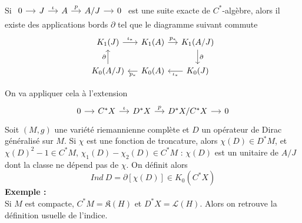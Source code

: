 \documentclass{beamer}
\begin{document}
\begin{frame}
\begin{thm}
Si $\begin{tikzcd}[ampersand replacement=\&,column sep = small]
0 \arrow{r} \& J \arrow{r}{\iota} \& A\arrow{r}{p} \& A/J\arrow{r} \& 0  
\end{tikzcd}$ est une suite exacte de $C^*$-algèbre, alors il existe des applications bords $\partial$ tel que le diagramme suivant commute
\[\begin{tikzcd}[ampersand replacement=\&,column sep = small]
 K_1(J)\arrow{r}{\iota_*}\& K_1(A)\arrow{r}{p_*}\& K_1(A/J)\arrow{d}{\partial}\\
K_0(A/J)\arrow{u}{\partial}\& K_0(A)\arrow{l}{p_*}\& K_0(J)\arrow{l}{\iota_*}
\end{tikzcd}\]
\end{thm}
\end{frame}

\begin{frame}
On va appliquer cela à l'extension \[\begin{tikzcd}[ampersand replacement=\&,column sep = small]
0 \arrow{r} \& C^*X \arrow{r}{\iota} \& D^*X\arrow{r}{p} \& D^*X/C^*X\arrow{r} \& 0  
\end{tikzcd}\]
Soit $(M,g)$ une variété riemannienne complète et $D$ un opérateur de Dirac généralisé sur $M$. Si $\chi$ est une fonction de troncature, alors $\chi(D)\in D^*M$, et $\chi(D)^2-1\in C^*M$, $\chi_1(D)-\chi_2(D)\in C^*M$ : $\chi(D)$ est un unitaire de $A/J$ dont la classe ne dépend pas de $\chi$. On définit alors 
\[Ind \ D = \partial [\chi(D)] \in K_0(C^*X)\]
\textbf{Exemple :}\\
Si $M$ est compacte, $C^*M = \mathfrak K(H)$ et $D^*X = \mathcal L(H)$. Alors on retrouve la définition usuelle de l'indice.
\end{frame}
\end{document}
